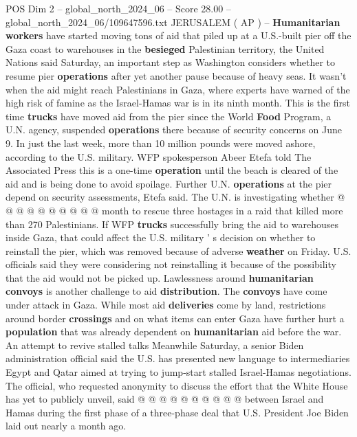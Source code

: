 \begin{textsample}{POS Dim 2 – global\_north\_2024\_06 – Score 28.00 – global\_north\_2024\_06/109647596.txt}  \label{ex:f2_pos_258}
JERUSALEM ( AP ) -- \textbf{Humanitarian} \textbf{workers} have started moving tons of aid that piled up at a U.S.-built pier off the Gaza coast to warehouses in the \textbf{besieged} Palestinian territory, the United Nations said Saturday, an important step as Washington considers whether to resume pier \textbf{operations} after yet another pause because of heavy seas.
It wasn't when the aid might reach Palestinians in Gaza, where experts have warned of the high risk of famine as the Israel-Hamas war is in its ninth month.
This is the first time \textbf{trucks} have moved aid from the pier since the World \textbf{Food} Program, a U.N. agency, suspended \textbf{operations} there because of security concerns on June 9.
In just the last week, more than 10 million pounds were moved ashore, according to the U.S. military.
WFP spokesperson Abeer Etefa told The Associated Press this is a one-time \textbf{operation} until the beach is cleared of the aid and is being done to avoid spoilage.
Further U.N. \textbf{operations} at the pier depend on security assessments, Etefa said.
The U.N. is investigating whether @ @ @ @ @ @ @ @ @ @ month to rescue three hostages in a raid that killed more than 270 Palestinians.
If WFP \textbf{trucks} successfully bring the aid to warehouses inside Gaza, that could affect the U.S. military ' s decision on whether to reinstall the pier, which was removed because of adverse \textbf{weather} on Friday.
U.S. officials said they were considering not reinstalling it because of the possibility that the aid would not be picked up.
Lawlessness around \textbf{humanitarian} \textbf{convoys} is another challenge to aid \textbf{distribution}.
The \textbf{convoys} have come under attack in Gaza.
While most aid \textbf{deliveries} come by land, restrictions around border \textbf{crossings} and on what items can enter Gaza have further hurt a \textbf{population} that was already dependent on \textbf{humanitarian} aid before the war.
An attempt to revive stalled talks Meanwhile Saturday, a senior Biden administration official said the U.S. has presented new language to intermediaries Egypt and Qatar aimed at trying to jump-start stalled Israel-Hamas negotiations.
The official, who requested anonymity to discuss the effort that the White House has yet to publicly unveil, said @ @ @ @ @ @ @ @ @ @ between Israel and Hamas during the first phase of a three-phase deal that U.S.
President Joe Biden laid out nearly a month ago.

\end{textsample}
